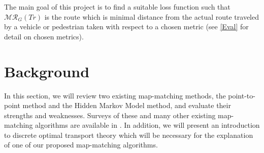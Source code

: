 \documentclass{article}
\numberwithin{equation}{section}
\theoremstyle{definition}
\begin{document}
The main goal of this project is to find a suitable loss function such that  $\mathcal{MR}_G(Tr)$ is the route which is minimal distance from the actual route traveled by a vehicle or pedestrian taken with respect to a chosen metric (see \autoref{Eval} for detail on chosen metrics).







    



\section{Background}

In this section, we will review two existing map-matching methods, the point-to-point method and the Hidden Markov Model method, and evaluate their strengths and weaknesses. Surveys of these and many other existing map-matching algorithms are available in \cite{CXHZ,QON}.
In addition, we will present an introduction to discrete optimal transport theory which will be necessary for the explanation of one of our proposed map-matching algorithms.
\end{document}
